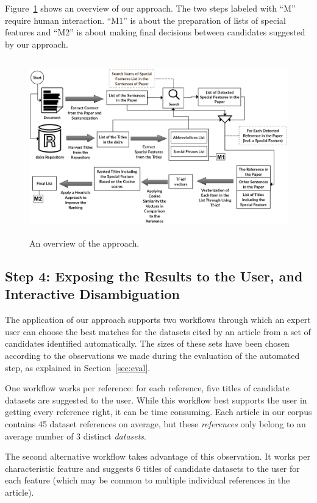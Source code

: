 \documentclass{IOS-Book-Article}
\begin{document}
Figure~\ref{fig:Overview_of_approach} shows an overview of our approach.
The two steps labeled with \enquote{M} require human interaction.
\enquote{M1} is about the preparation of lists of special features and \enquote{M2} is about making final decisions between candidates suggested by our approach.

\begin{figure}[h]
	\centering
	\includegraphics[height=3in]{Overwveiw_System.png}
	\caption{An overview of the approach.}
	\label{fig:Overview_of_approach}
\end{figure}

\subsection{Step 4: Exposing the Results to the User, and Interactive Disambiguation}
\label{sec:expos-results-reus}	
The application of our approach supports two workflows through which an expert user can choose the best matches for the datasets cited by an article from a set of candidates identified automatically. The sizes of these sets have been chosen according to the observations we made during the evaluation of the automated step, as explained in Section~\ref{sec:eval}.

One workflow works per reference: for each reference, five titles of candidate datasets are suggested to the user.
While this workflow best supports the user in getting every reference right, it can be time consuming.
Each article in our corpus contains 45 dataset references on average, but these \emph{references} only belong to an average number of 3 distinct \emph{datasets}.

The second alternative workflow takes advantage of this observation.
It works per characteristic feature and suggests 6 titles of candidate datasets to the user for each feature (which may be common to multiple individual references in the article). 
\end{document}
